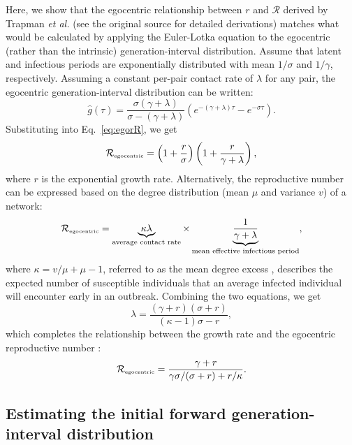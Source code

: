 \documentclass[12pt]{article}
\newcommand{\eref}[1]{Eq.~\ref{eq:#1}}
\newcommand{\Rx}[1]{\ensuremath{{\mathcal R}_{#1}}\xspace}
\newcommand{\RR}{\ensuremath{{\mathcal R}}}
\newcommand{\Rego}{\Rx{\textrm{\tiny egocentric}}}
\begin{document}
Here, we show that the egocentric relationship between $r$ and $\RR$ derived by Trapman \textit{et al.} \cite{trapman2016inferring} (see the original source for detailed derivations) matches what would be calculated by applying the Euler-Lotka equation to the egocentric (rather than the intrinsic) generation-interval distribution. 
Assume that latent and infectious periods are exponentially distributed with mean $1/\sigma$ and $1/\gamma$, respectively.
Assuming a constant per-pair contact rate of $\lambda$ for any pair, the egocentric generation-interval distribution can be written:
\begin{equation}
\hat{g}(\tau) = \frac{\sigma (\gamma + \lambda)}{\sigma - (\gamma + \lambda)} \left(e^{-(\gamma + \lambda)\tau} - e^{-\sigma \tau}\right).
\end{equation}
Substituting into \eref{egorR}, we get
\begin{equation}
\Rego = \left(1 + \frac{r}{\sigma}\right) \left(1 + \frac{r}{\gamma + \lambda}\right),
\end{equation}
where $r$ is the exponential growth rate.
Alternatively, the reproductive number can be expressed based on the degree distribution (mean $\mu$ and variance $v$) of a network:
\begin{equation}
\Rego = \underbrace{\kappa \lambda}_{\text{average contact rate}} \times \underbrace{\frac{1}{\gamma + \lambda}}_{\text{mean effective infectious period}},
\end{equation}
where $\kappa = v/\mu + \mu - 1$, referred to as the mean degree excess \citep{newman2003structure}, describes the expected number of susceptible individuals that an average infected individual will encounter early in an outbreak.
Combining the two equations, we get
\begin{equation}
\lambda = \frac{(\gamma + r) (\sigma + r)}{(\kappa - 1) \sigma - r},
\end{equation}
which completes the relationship between the growth rate and the egocentric reproductive number \citep{trapman2016inferring}:
\begin{equation}
\Rego = \frac{\gamma + r}{\gamma \sigma/(\sigma + r) + r/\kappa}.
\end{equation}

\subsection{Estimating the initial forward generation-interval distribution}
\end{document}
